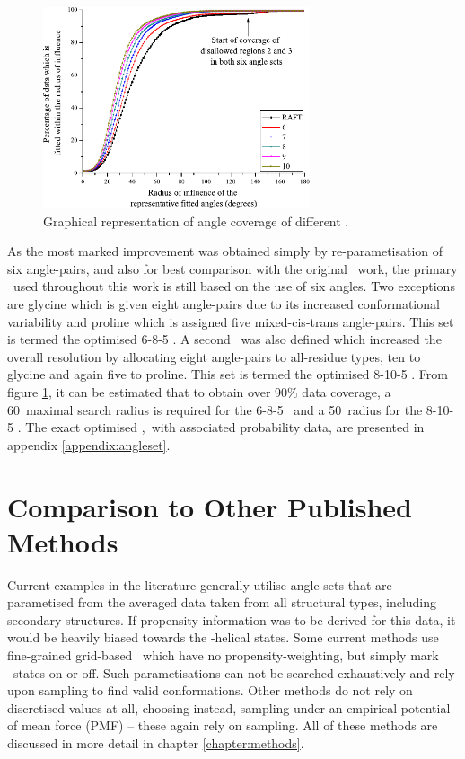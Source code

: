 \begin{figure}[hptb]
\begin{center}
\includegraphics[width=0.7\textwidth]{05-ReducedRep/closest_angle/IncreaseResolution.pdf}
\caption{Graphical representation of angle coverage of different \anglesets.}
\label{fig:reducedrep:anglesetres}
\end{center}
\end{figure}

As the most marked improvement was obtained simply by re-parametisation of six angle-pairs, and also for best comparison with the original \raft\ work, the primary \angleset\ used throughout this work is still based on the use of six angles. Two exceptions are glycine which is given eight angle-pairs due to its increased conformational variability and proline which is assigned five mixed-cis-trans angle-pairs. This set is termed the optimised 6-8-5 \angleset. A second \angleset\ was also defined which increased the overall resolution by allocating eight angle-pairs to all-residue types, ten to glycine and again five to proline. This set is termed the optimised 8-10-5 \angleset. From figure \ref{fig:reducedrep:anglesetres}, it can be estimated that to obtain over 90\% data coverage, a 60\degree\ maximal search radius is required for the 6-8-5 \angleset\ and a 50\degree\ radius for the 8-10-5 \angleset.
The exact optimised \anglesets,\ with associated probability data, are presented in appendix \ref{appendix:angleset}.

\section{Comparison to Other Published Methods}

Current examples in the literature generally utilise angle-sets that are parametised from the averaged data taken from all structural types, including secondary structures.  If propensity information was to be derived for this data, it would be heavily biased towards the \al-helical states. Some current methods use fine-grained grid-based  \anglesets\ which have no propensity-weighting, but simply mark \phipsi\ states on or off\cite{METHOD:Plop,METHOD:RapperB}. Such parametisations can not be searched exhaustively and rely upon sampling to find valid conformations. Other methods do not rely on discretised values at all, choosing instead, sampling under an empirical potential of mean force (PMF)\cite{METHOD:Modloop} -- these again rely on sampling.
All of these methods are discussed in more detail in chapter \ref{chapter:methods}.

